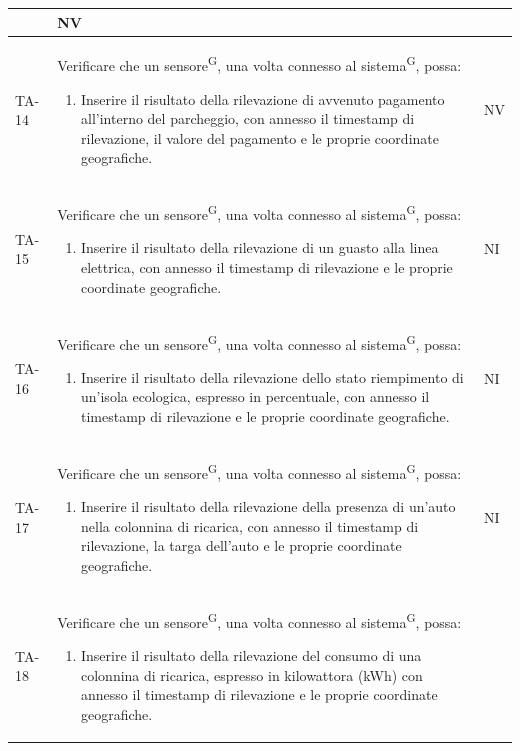 \documentclass[8pt]{article}
\newcommand{\glossterm}[1]{#1\textsuperscript{G}} %
\begin{document}
\begin{longtable}{|>{\centering}p{2cm}|>{\RaggedRight}m{12cm}|>{\centering\arraybackslash}p{2cm}|}
\begin{enumerate}
    \end{enumerate}
    & NV \\
    \hline
    TA-14 &
    Verificare che un \glossterm{sensore}, una volta connesso al \glossterm{sistema}, possa:
    \begin{enumerate}
    \item Inserire il risultato della rilevazione di avvenuto pagamento all’interno del
        parcheggio, con annesso il timestamp di rilevazione, il valore del pagamento e le proprie coordinate geografiche. 
    \end{enumerate}
    & NV \\
    \hline
    TA-15 &
    Verificare che un \glossterm{sensore}, una volta connesso al \glossterm{sistema}, possa:
    \begin{enumerate}
    \item Inserire il risultato della rilevazione di un guasto alla linea elettrica, con annesso il timestamp di rilevazione e le proprie coordinate geografiche. 
    \end{enumerate}
    & NI \\
    \hline
    TA-16 &
    Verificare che un \glossterm{sensore}, una volta connesso al \glossterm{sistema}, possa:
    \begin{enumerate}
    \item Inserire il risultato della rilevazione dello stato riempimento di un'isola ecologica, espresso in percentuale, con annesso il timestamp di rilevazione e le proprie coordinate geografiche. 
    \end{enumerate}
    & NI \\
    \hline
    TA-17 &
    Verificare che un \glossterm{sensore}, una volta connesso al \glossterm{sistema}, possa:
    \begin{enumerate}
    \item Inserire il risultato della rilevazione della presenza di un'auto nella colonnina di ricarica, con annesso il timestamp di rilevazione, la targa dell'auto e le proprie coordinate geografiche.  
    \end{enumerate}
    & NI \\
    \hline
    TA-18 &
    Verificare che un \glossterm{sensore}, una volta connesso al \glossterm{sistema}, possa:
    \begin{enumerate}
    \item Inserire il risultato della rilevazione del consumo di una colonnina di ricarica, espresso in kilowattora (kWh) con annesso il timestamp di rilevazione e le proprie coordinate geografiche.  

\end{enumerate}
\end{longtable}
\end{document}
